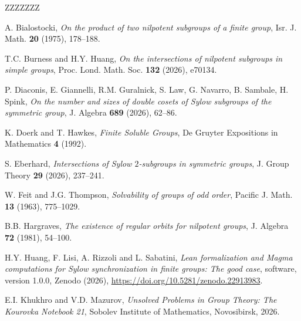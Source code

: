 \documentclass[11pt]{amsart}
\numberwithin{equation}{section}
\theoremstyle{definition}
\theoremstyle{remark}
\begin{document}
\vspace{0.1cm}
\begin{thebibliography}{ZZZZZZZ} 

  A. Bialostocki,
 \textit{On the product of two nilpotent subgroups of a finite group},
 Isr. J. Math. \textbf{20} (1975), 178--188. 
 
  T.C. Burness and H.Y. Huang,
  \textit{On the intersections of nilpotent subgroups in simple groups},
  Proc. Lond. Math. Soc. \textbf{132} (2026), e70134.

    P. Diaconis, E. Giannelli, R.M. Guralnick, S. Law, G. Navarro, B. Sambale, H. Spink,
  \textit{On the number and sizes of double cosets of Sylow subgroups of the symmetric group},
 J. Algebra \textbf{689} (2026), 62--86.
 
   K. Doerk and T. Hawkes,
  \textit{Finite Soluble Groups},
  De Gruyter Expositions in Mathematics \textbf{4} (1992).
  

   S. Eberhard,
  \textit{Intersections of Sylow $2$-subgroups in symmetric groups},
   J. Group Theory \textbf{29} (2026), 237--241.

 W. Feit and J.G. Thompson,
\emph{Solvability of groups of odd order},
Pacific J. Math. \textbf{13} (1963), 775--1029.

  B.B. Hargraves,
 \textit{The existence of regular orbits for nilpotent groups}, 
J. Algebra \textbf{72} (1981), 54--100.


 H.Y. Huang, F. Lisi, A. Rizzoli and L. Sabatini,
\textit{Lean formalization and Magma computations for Sylow synchronization in finite groups: The good case},
software, version 1.0.0, Zenodo (2026),
\url{https://doi.org/10.5281/zenodo.22913983}.

 E.I. Khukhro and V.D. Mazurov,
 \textit{Unsolved Problems in Group Theory: The Kourovka Notebook 21}, 
Sobolev Institute of Mathematics, Novosibirsk, 2026.



\end{thebibliography}
\end{document}
